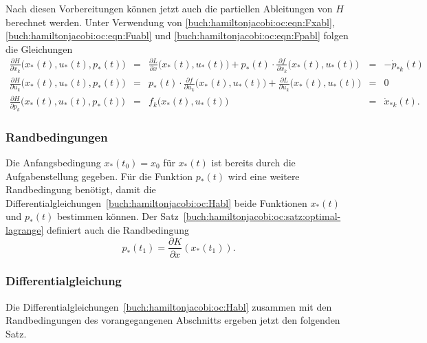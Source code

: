 Nach diesen Vorbereitungen können jetzt auch die partiellen Ableitungen
von $H$ berechnet werden.
Unter Verwendung von 
\eqref{buch:hamiltonjacobi:oc:eqn:Fxabl},
\eqref{buch:hamiltonjacobi:oc:eqn:Fuabl}
und
\eqref{buch:hamiltonjacobi:oc:eqn:Fpabl}
folgen die Gleichungen
\begin{equation}
\renewcommand{\arraycolsep}{2pt}
\renewcommand{\arraystretch}{2.0}
\begin{array}{rclcl}
\displaystyle
\frac{\partial H}{\partial x_k}\bigl(x_*(t),u_*(t),p_*(t)\bigr)
&=&
\displaystyle
\frac{\partial L}{\partial x}\bigl(x_*(t),u_*(t)\bigr)
+
p_*(t)\cdot\frac{\partial f}{\partial x_k}\bigl(x_*(t),u_*(t)\bigr)
&=&-\dot{p}_{*k}(t)
\\
\displaystyle
\frac{\partial H}{\partial u_k}\bigl(x_*(t),u_*(t),p_*(t)\bigr)
&=&
\displaystyle
p_*(t)\cdot
\frac{\partial f}{\partial u_k}\bigl(x_*(t),u_*(t)\bigr)
+
\frac{\partial L}{\partial u_k}\bigl(x_*(t),u_*(t)\bigr)
&=&0
\\
\displaystyle
\frac{\partial H}{\partial p_k}\bigl(x_*(t),u_*(t),p_*(t)\bigr)
&=&
f_k\bigl(x_*(t),u_*(t)\bigr)
&=&
\dot{x}_{*k}(t).
\end{array}
\label{buch:hamiltonjacobi:oc:Habl}
\end{equation}

%
%
\subsubsection{Randbedingungen}
Die Anfangsbedingung $x_*(t_0)=x_0$ für $x_*(t)$ ist bereits durch
die Aufgabenstellung gegeben.
Für die Funktion $p_*(t)$ wird eine weitere Randbedingung benötigt,
damit die Differentialgleichungen~\eqref{buch:hamiltonjacobi:oc:Habl}
beide Funktionen $x_*(t)$ und $p_*(t)$ bestimmen können.
Der Satz~\ref{buch:hamiltonjacobi:oc:satz:optimal-lagrange}
definiert auch die Randbedingung
\[
p_*(t_1)
=
\frac{\partial K}{\partial x}(x_*(t_1)).
\]

%
%
\subsubsection{Differentialgleichung}
Die Differentialgleichungen~\eqref{buch:hamiltonjacobi:oc:Habl} zusammen
mit den Randbedingungen des vorangegangenen Abschnitts ergeben jetzt
den folgenden Satz.

